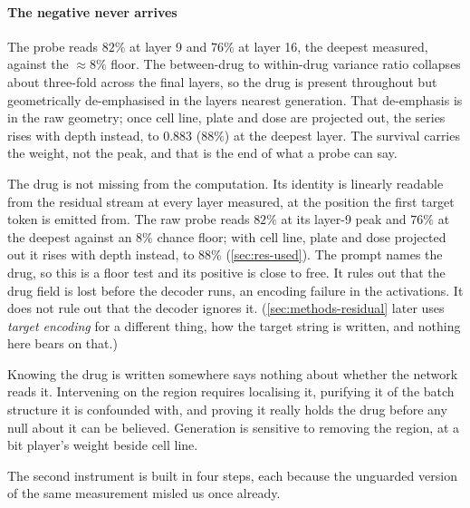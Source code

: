 \paragraph{The negative never arrives} The probe reads $82\%$ at layer 9 and
$76\%$ at layer 16, the deepest measured, against the $\approx 8\%$ floor. The
between-drug to within-drug variance ratio collapses about three-fold across the
final layers, so the drug is present throughout but geometrically de-emphasised
in the layers nearest generation. That de-emphasis is in the raw geometry; once
cell line, plate and dose are projected out, the series rises with depth instead, to
$0.883$ ($88\%$) at the deepest layer. The survival carries the weight, not the
peak, and that is the end of what a probe can say.

\begin{claim}
The drug is not missing from the computation. Its identity is linearly readable
from the residual stream at every layer measured, at the position the first
target token is emitted from. The raw probe reads $82\%$ at its layer-9 peak
and $76\%$ at the deepest against an $8\%$ chance floor; with cell line, plate
and dose projected out it rises with depth instead, to $88\%$
(\cref{sec:res-used}). The prompt names the drug, so this is a floor test and its
positive is close to free. It rules out that the drug field is lost before the
decoder runs, an encoding failure in the activations. It does not rule out that
the decoder ignores it. (\cref{sec:methods-residual} later uses \emph{target
encoding} for a different thing, how the target string is written, and nothing
here bears on that.)
\end{claim}


\begin{question}[3]
Knowing the drug is written somewhere says nothing about whether the network
reads it. Intervening on the region requires localising it, purifying it of the
batch structure it is confounded with, and proving it really holds the drug
before any null about it can be believed. Generation is sensitive to removing the
region, at a bit player's weight beside cell line.
\end{question}

\noindent
The second instrument is built in four steps, each because the unguarded version
of the same measurement misled us once already.

